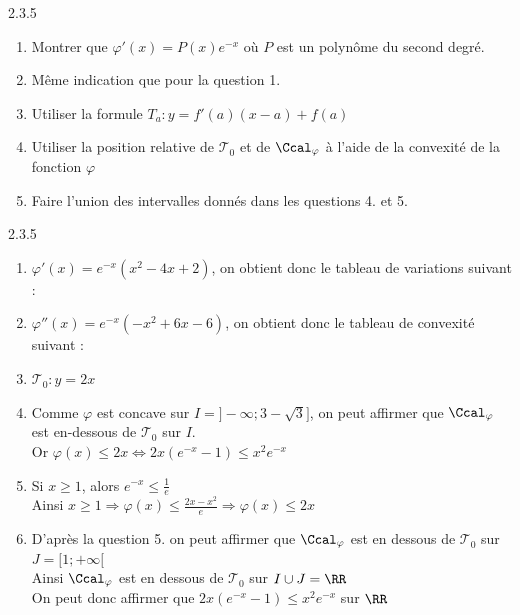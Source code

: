 \begin{Indication}{2.3.5}
	\begin{enumerate}
		\item Montrer que $\varphi'(x)=P(x)e^{-x}$ où $P$ est un polynôme du second degré.
		\item Même indication que pour la question 1.
		\item Utiliser la formule $T_a:y=f'(a)(x-a)+f(a)$
		\item Utiliser la position relative de $\mathcal{T}_0$ et de $\Ccal_\varphi$ à l'aide de la convexité de la fonction $\varphi$
		\item[6.] Faire l'union des intervalles donnés dans les questions 4. et 5.
	\end{enumerate}
\end{Indication}
\begin{Solution}{2.3.5}
	\begin{enumerate}
		\item $\varphi'(x)=e^{-x}(x^2-4x+2)$, on obtient donc le tableau de variations suivant :
		
		\item $\varphi''(x)=e^{-x}(-x^2+6x-6)$, on obtient donc le tableau de convexité suivant :
		
		\item $\mathcal{T}_0:y=2x$
		\item Comme $\varphi$ est concave sur $I=]-\infty;3-\sqrt{3}]$, on peut affirmer que $\Ccal_\varphi$ est en-dessous de $\mathcal{T}_0$ sur $I$.\\
		Or $\varphi(x)\leq2x \Leftrightarrow 2x(e^{-x}-1)\leq x^2e^{-x}$
		\item Si $x\geq1$, alors $e^{-x}\leq \frac{1}{e}$\\
		Ainsi $x\geq1 \Rightarrow \varphi(x)\leq\frac{2x-x^2}{e} \Rightarrow \varphi(x)\leq 2x$
		\item D'après la question 5. on peut affirmer que $\Ccal_\varphi$ est en dessous de $\mathcal{T}_0$ sur $J=[1;+\infty[$\\
		Ainsi $\Ccal_\varphi$ est en dessous de $\mathcal{T}_0$ sur $I\cup J=\RR$\\
		On peut donc affirmer que $2x(e^{-x}-1)\leq x^2e^{-x}$ sur $\RR$
	\end{enumerate}
\end{Solution}

